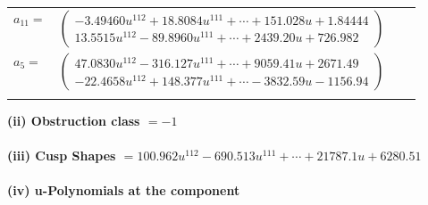 \documentclass[1p]{elsarticle_modified}
\theoremstyle{definition}
\begin{document}
\begin{tabular}{m{7pt} m{180pt} m{7pt} m{180pt} }
\flushright $a_{11}=$&$\begin{pmatrix}-3.49460 u^{112}+18.8084 u^{111}+\cdots+151.028 u+1.84444\\13.5515 u^{112}-89.8960 u^{111}+\cdots+2439.20 u+726.982\end{pmatrix}$ \\
\flushright $a_{5}=$&$\begin{pmatrix}47.0830 u^{112}-316.127 u^{111}+\cdots+9059.41 u+2671.49\\-22.4658 u^{112}+148.377 u^{111}+\cdots-3832.59 u-1156.94\end{pmatrix}$\\&\end{tabular}
\flushleft \textbf{(ii) Obstruction class $= -1$}\\~\\
\flushleft \textbf{(iii) Cusp Shapes $= 100.962 u^{112}-690.513 u^{111}+\cdots+21787.1 u+6280.51$}\\~\\
\newpage\renewcommand{\arraystretch}{1}
\flushleft \textbf{(iv) u-Polynomials at the component}\newline \\
\end{document}
